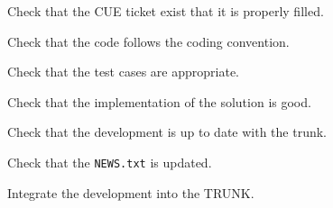 \begin{todolist}
\setlength\itemsep{0.01em}
\item Check that the CUE ticket exist that it is properly filled.
\item Check that the code follows the coding convention.
\item Check that the test cases are appropriate.
\item Check that the implementation of the solution is good.
\item Check that the development is up to date with the trunk.
\item Check that the \verb!NEWS.txt! is updated.
\item Integrate the development into the TRUNK\@.
\end{todolist}
